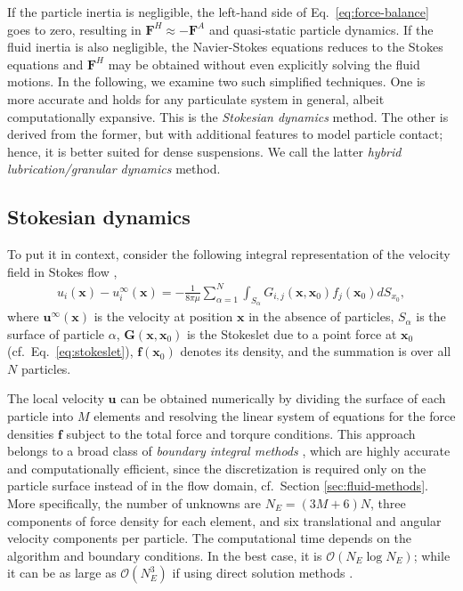 If the particle inertia is negligible, the left-hand side of Eq.\ \eqref{eq:force-balance} goes to zero, resulting in $\bm{F}^H \approx -\bm{F}^A$ and quasi-static particle dynamics.
If the fluid inertia is also negligible, the Navier-Stokes equations reduces to the Stokes equations and $\bm{F}^H$ may be obtained without even explicitly solving the fluid motions.
In the following, we examine two such simplified techniques.
One is more accurate and holds for any particulate system in general, albeit computationally expansive. This is the \emph{Stokesian dynamics} method.
The other is derived from the former, but with additional features to model particle contact; hence, it is better suited for dense suspensions. We call the latter \emph{hybrid lubrication/granular dynamics} method.

\subsection{Stokesian dynamics}
\label{subsec:sd}

To put it in context, consider the following integral representation of the velocity field in Stokes flow \citep{Ladyzhenskaya},
\begin{equation} \label{eq:boundary-integral}
 \begin{aligned}
  u_i(\bm{x}) - u_i^\infty(\bm{x}) = -\frac{1}{8\pi \mu} \sum_{\alpha=1}^N  \int_{S_\alpha} G_{i,j} (\bm{x},\bm{x}_0) f_j(\bm{x}_0) dS_{x_0},
 \end{aligned}
\end{equation}
where $\bm{u}^\infty(\bm{x})$ is the velocity at position $\bm{x}$ in the absence of particles,
$S_\alpha$ is the surface of particle $\alpha$,
$\bm{G}(\bm{x},\bm{x}_0)$ is the Stokeslet due to a point force at $\bm{x}_0$ (cf.\ Eq.\ \ref{eq:stokeslet}),
$\bm f(\bm{x}_0)$ denotes its density,
and the summation is over all $N$ particles.

The local velocity $\bm{u}$ can be obtained numerically by dividing the surface of each particle into $M$ elements and resolving the linear system of equations for the force densities $\bm f$ subject to the total force and torqure conditions.
This approach belongs to a broad class of \emph{boundary integral methods} \citep{Pozrikidis}, which are highly accurate and computationally efficient, since the discretization is required only on the particle surface instead of in the flow domain, cf.\ Section \ref{sec:fluid-methods}.
More specifically, the number of unknowns are $N_E=(3M+6)N$, \ie three components of force density for each element, and six translational and angular velocity components per particle.
The computational time depends on the algorithm and boundary conditions. In the best case, it is $\mathcal{O}(N_E\log N_E)$; while it can be as large as $\mathcal{O}(N_E^3)$ if using direct solution methods \citep{graham_2018}.

